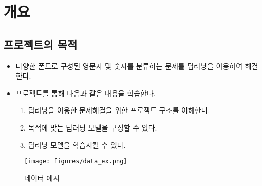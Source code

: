 \section{개요}{\label{sec:intro}}

\subsection{프로젝트의 목적}
\begin{itemize}\tightlist
    \item 다양한 폰트로 구성된 영문자 및 숫자를 분류하는 문제를 딥러닝을 이용하여 해결한다.
    \item 프로젝트를 통해 다음과 같은 내용을 학습한다.
    \begin{enumerate}[(1)]\tightlist
        \item 딥러닝을 이용한 문제해결을 위한 프로젝트 구조를 이해한다.
        \item 목적에 맞는 딥러닝 모델을 구성할 수 있다.
        \item 딥러닝 모델을 학습시킬 수 있다.
    \end{enumerate}

\end{itemize}



\begin{figure}[htp]
    \centering
    \texttt{[image: figures/data\_ex.png]}
    \caption{데이터 예시}
    \label{fig:data_ex}
\end{figure}

